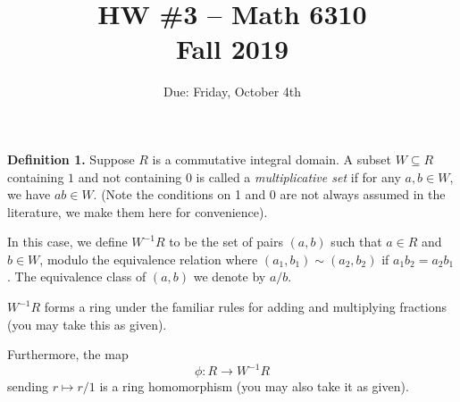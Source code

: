 \documentclass[11pt]{amsart}
\renewcommand{\to}[1][]{\xrightarrow{\ #1\ }}
\begin{document}
\title{HW \#3 -- Math 6310\\Fall 2019}
\author{Due: Friday, October 4th}
\maketitle
{\bf Definition 1.}  Suppose $R$ is a commutative integral domain.  A subset $W \subseteq R$ containing $1$ and not containing $0$ is called a \emph{multiplicative set} if for any $a,b \in W$, we have $ab \in W$.  (Note the conditions on 1 and 0 are not always assumed in the literature, we make them here for convenience).

In this case, we define $W^{-1}R$ to be the set of pairs $(a, b)$ such that $a \in R$ and $b \in W$, modulo the equivalence relation where $(a_1, b_1) \sim (a_2, b_2)$ if $a_1 b_2 = a_2 b_1$.  The equivalence class of $(a,b)$ we denote by $a/b$.  

$W^{-1}R$ forms a ring under the familiar rules for adding and multiplying fractions (you may take this as given).  

Furthermore, the map 
\[
    \phi : R \to W^{-1} R
    \]
sending $r \mapsto r/1$ is a ring homomorphism (you may also take it as given).
\end{document}
